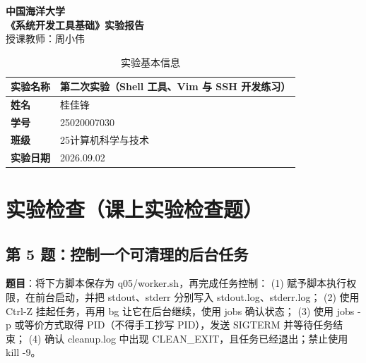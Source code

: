 \documentclass[12pt,a4paper]{article}
\begin{document}
\begin{center}
    {\LARGE\bfseries 中国海洋大学}\\[6pt]
    {\Large\bfseries 《系统开发工具基础》实验报告}\\[6pt]
    {\normalsize 授课教师：周小伟}
\end{center}
\vspace{0.5em}
\begin{table}[H]
    \centering
    \renewcommand{\arraystretch}{1.5}
    \begin{tabular}{>{\bfseries}p{3.2cm}p{11.5cm}}
        \toprule
        实验名称 & 第二次实验（Shell 工具、Vim 与 SSH 开发练习） \\
        \midrule
        姓名     & 桂佳锋 \\
        学号     & 25020007030 \\
        班级     & 25计算机科学与技术 \\
        实验日期 & 2026.09.02 \\
        \bottomrule
    \end{tabular}
    \caption{实验基本信息}
    \label{tab:info}
\end{table}

\section{实验检查（课上实验检查题）}

\subsection{第 5 题：控制一个可清理的后台任务}

\textbf{题目}：将下方脚本保存为 q05/worker.sh，再完成任务控制：
(1) 赋予脚本执行权限，在前台启动，并把 stdout、stderr 分别写入 stdout.log、stderr.log；
(2) 使用 Ctrl-Z 挂起任务，再用 bg 让它在后台继续，使用 jobs 确认状态；
(3) 使用 jobs -p 或等价方式取得 PID（不得手工抄写 PID），发送 SIGTERM 并等待任务结束；
(4) 确认 cleanup.log 中出现 CLEAN\_EXIT，且任务已经退出；禁止使用 kill -9。
\end{document}
